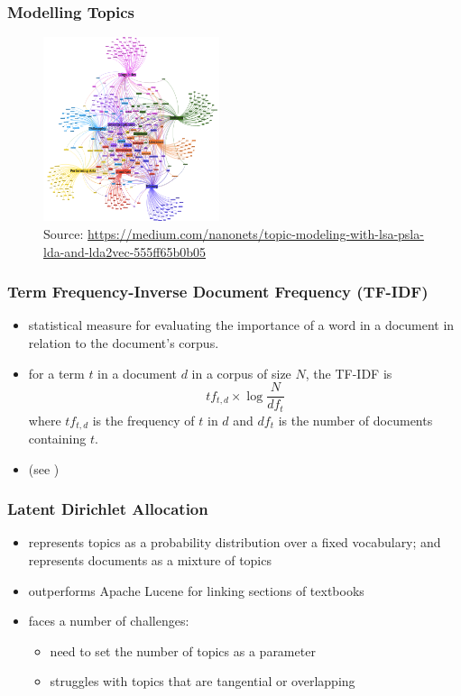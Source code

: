 \documentclass[aspectratio=169]{beamer}
\let\oldparencites\parencites
\renewcommand{\parencites}[1]{{\color{gray}\scriptsize \oldparencites{#1}}}
\let\oldcites\cites
\renewcommand{\cites}[1]{{\color{gray}\scriptsize (see \oldcites{#1})}}
\newcommand{\source}[1]{\caption*{\tiny Source: \url{#1}}}
\begin{document}
\begin{frame} \frametitle{Modelling Topics}

\begin{figure}[h]
    \centering
    \includegraphics[width=0.46\textwidth]{topics.png}
    \source{https://medium.com/nanonets/topic-modeling-with-lsa-psla-lda-and-lda2vec-555ff65b0b05}
\end{figure}

\end{frame}


\begin{frame} \frametitle{Term Frequency-Inverse Document Frequency (TF-IDF)}

\begin{itemize}
    \item statistical measure for evaluating the importance of a word in a document in relation to the document’s corpus. \pause
    \item for a term $t$ in a document $d$ in a corpus of size $N$, the TF-IDF is
    \[ {tf}_{t,d} \times \log\frac{N}{{df}_t} \]
    where ${tf}_{t,d}$ is the frequency of $t$ in $d$ and ${df}_t$ is the number of documents containing $t$.
    \item \cites{sparckjones1972}
\end{itemize}

\end{frame}


\begin{frame} \frametitle{Latent Dirichlet Allocation}

\begin{itemize}
    \item represents topics as a probability distribution over a fixed vocabulary; and represents documents as a mixture of topics \\ \parencites{blei2003} \pause
    \item outperforms Apache Lucene for linking sections of textbooks \\ \parencites{guerra2013} \pause
    \item faces a number of challenges:
    \begin{itemize}
        \item need to set the number of topics as a parameter
        \item struggles with topics that are tangential or overlapping \\ \parencites{ajinaja2023}
    \end{itemize}
\end{itemize}

\end{frame}
\end{document}
